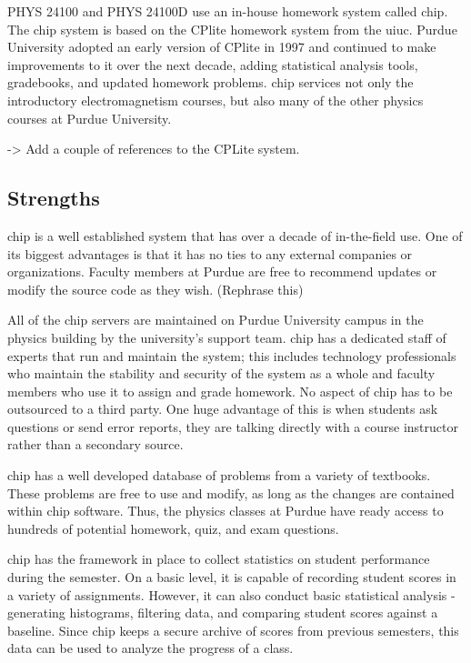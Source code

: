 PHYS 24100 and PHYS 24100D use an in-house homework system called \gls{chip}. The \gls{chip} system is based on the CPlite homework system from the \gls{uiuc}. Purdue University adopted an early version of CPlite in 1997 and continued to make improvements to it over the next decade, adding statistical analysis tools, gradebooks, and updated homework problems. \gls{chip} services not only the introductory electromagnetism courses, but also many of the other physics courses at Purdue University.

-> Add a couple of references to the CPLite system.

\subsection*{Strengths}

\gls{chip} is a well established system that has over a decade of in-the-field use. One of its biggest advantages is that it has no ties to any external companies or organizations. Faculty members at Purdue are free to recommend updates or modify the source code as they wish. (Rephrase this)

All of the \gls{chip} servers are maintained on Purdue University campus in the physics building by the university's support team. \gls{chip} has a dedicated staff of experts that run and maintain the system; this includes technology professionals who maintain the stability and security of the system as a whole and faculty members who use it to assign and grade homework. No aspect of \gls{chip} has to be outsourced to a third party. One huge advantage of this is when students ask questions or send error reports, they are talking directly with a course instructor rather than a secondary source.

\gls{chip} has a well developed database of problems from a variety of textbooks. These problems are free to use and modify, as long as the changes are contained within \gls{chip} software. Thus, the physics classes at Purdue have ready access to hundreds of potential homework, quiz, and exam questions.

\gls{chip} has the framework in place to collect statistics on student performance during the semester. On a basic level, it is capable of recording student scores in a variety of assignments. However, it can also conduct basic statistical analysis - generating histograms, filtering data, and comparing student scores against a baseline. Since \gls{chip} keeps a secure archive of scores from previous semesters, this data can be used to analyze the progress of a class.

